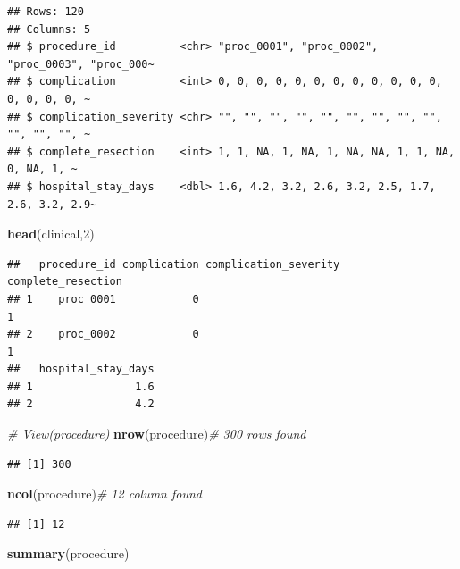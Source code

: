 \documentclass[
]{article}
\newenvironment{Shaded}{\begin{snugshade}}{\end{snugshade}}
\newcommand{\CommentTok}[1]{\textcolor[rgb]{0.56,0.35,0.01}{\textit{#1}}}
\newcommand{\DecValTok}[1]{\textcolor[rgb]{0.00,0.00,0.81}{#1}}
\newcommand{\FunctionTok}[1]{\textcolor[rgb]{0.13,0.29,0.53}{\textbf{#1}}}
\newcommand{\NormalTok}[1]{#1}
\begin{document}
\begin{verbatim}
## Rows: 120
## Columns: 5
## $ procedure_id          <chr> "proc_0001", "proc_0002", "proc_0003", "proc_000~
## $ complication          <int> 0, 0, 0, 0, 0, 0, 0, 0, 0, 0, 0, 0, 0, 0, 0, 0, ~
## $ complication_severity <chr> "", "", "", "", "", "", "", "", "", "", "", "", ~
## $ complete_resection    <int> 1, 1, NA, 1, NA, 1, NA, NA, 1, 1, NA, 0, NA, 1, ~
## $ hospital_stay_days    <dbl> 1.6, 4.2, 3.2, 2.6, 3.2, 2.5, 1.7, 2.6, 3.2, 2.9~
\end{verbatim}

\begin{Shaded}
\begin{Highlighting}[]
\FunctionTok{head}\NormalTok{(clinical,}\DecValTok{2}\NormalTok{)}
\end{Highlighting}
\end{Shaded}

\begin{verbatim}
##   procedure_id complication complication_severity complete_resection
## 1    proc_0001            0                                        1
## 2    proc_0002            0                                        1
##   hospital_stay_days
## 1                1.6
## 2                4.2
\end{verbatim}

\begin{Shaded}
\begin{Highlighting}[]
\CommentTok{\# View(procedure)}
\FunctionTok{nrow}\NormalTok{(procedure)}\CommentTok{\# 300 rows found }
\end{Highlighting}
\end{Shaded}

\begin{verbatim}
## [1] 300
\end{verbatim}

\begin{Shaded}
\begin{Highlighting}[]
\FunctionTok{ncol}\NormalTok{(procedure)}\CommentTok{\# 12 column found}
\end{Highlighting}
\end{Shaded}

\begin{verbatim}
## [1] 12
\end{verbatim}

\begin{Shaded}
\begin{Highlighting}[]
\FunctionTok{summary}\NormalTok{(procedure)}
\end{Highlighting}
\end{Shaded}
\end{document}
